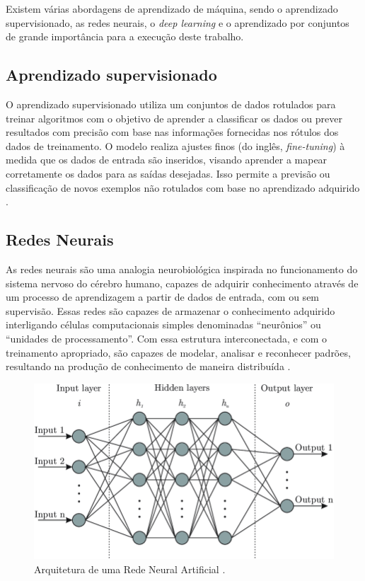 Existem várias abordagens de aprendizado de máquina, sendo o aprendizado supervisionado, as redes neurais, o \textit{deep learning} e o aprendizado por conjuntos de grande importância para a execução deste trabalho.

\subsection{Aprendizado supervisionado}

O aprendizado supervisionado utiliza um conjuntos de dados rotulados para treinar algoritmos com o objetivo de aprender a classificar os dados ou prever resultados com precisão com base nas informações fornecidas nos rótulos dos dados de treinamento. O modelo realiza ajustes finos (do inglês, \textit{fine-tuning}) à medida que os dados de entrada são inseridos, visando aprender a mapear corretamente os dados para as saídas desejadas. Isso permite a previsão ou classificação de novos exemplos não rotulados com base no aprendizado adquirido \cite{RussellNorvig1995}.

\subsection{Redes Neurais}

As redes neurais são uma analogia neurobiológica inspirada no funcionamento do sistema nervoso do cérebro humano, capazes de adquirir conhecimento através de um processo de aprendizagem a partir de dados de entrada, com ou sem supervisão. Essas redes são capazes de armazenar o conhecimento adquirido interligando células computacionais simples denominadas ``neurônios'' ou ``unidades de processamento''. Com essa estrutura interconectada, e com o treinamento apropriado, são capazes de modelar, analisar e reconhecer padrões, resultando na produção de conhecimento de maneira distribuída \cite{Haykin2007}.

\begin{figure}[!htbp]
	\centering
	\includegraphics[scale=0.4]{imagens/arch-rede-neural-artificial.png}
    \caption {Arquitetura de uma Rede Neural Artificial \cite{RedeNeuralImagem}.}
\end{figure}

